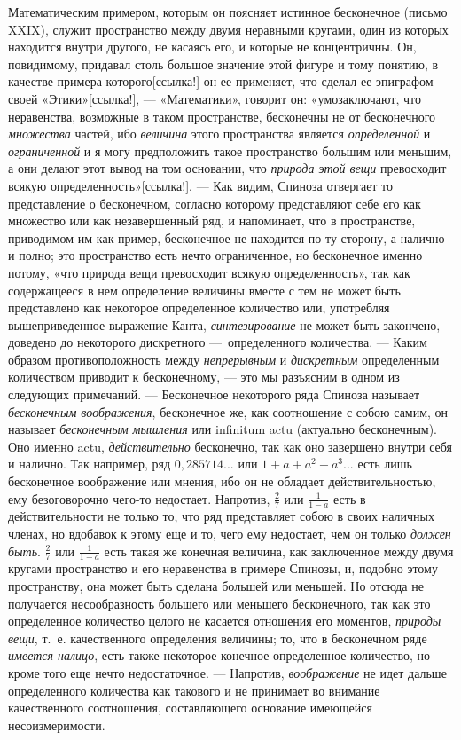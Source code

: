{Математическим примером, которым он поясняет истинное бесконечное (письмо
XXIX), служит пространство между двумя неравными кругами, один из которых
находится внутри другого, не касаясь его, и которые не концентричны. Он,
повидимому, придавал столь большое значение этой фигуре и тому понятию, в
качестве примера
которого[ссылка!] он ее применяет, что сделал ее
эпиграфом своей
«Этики»[ссылка!], — «Математики», говорит он:
«умозаключают, что неравенства, возможные в таком пространстве, бесконечны
не от бесконечного {\em множества} частей, ибо
{\em величина} этого пространства является
{\em определенной} и
{\em ограниченной} и я могу предположить такое
пространство большим или меньшим, а они делают этот вывод на том основании,
что {\em природа этой вещи} превосходит всякую
определенность»[ссылка!]. — Как видим, Спиноза
отвергает то представление о бесконечном, согласно которому представляют
себе его как множество или как незавершенный ряд, и напоминает, что в
пространстве, приводимом им как пример, бесконечное не находится по ту
сторону, а налично и полно; это пространство есть нечто ограниченное, но
бесконечное именно потому, «что природа вещи превосходит всякую
определенность», так как содержащееся в нем определение величины вместе с
тем не может быть представлено как некоторое определенное количество или,
употребляя вышеприведенное выражение Канта,
{\em синтезирование} не может быть закончено, доведено
до некоторого дискретного —~определенного количества. — Каким образом
противоположность между {\em непрерывным} и
{\em дискретным} определенным количеством приводит к
бесконечному, — это мы разъясним в одном из следующих примечаний. —
Бесконечное некоторого ряда Спиноза называет
{\em бесконечным воображения}, бесконечное же, как
соотношение с собою самим, он называет {\em бесконечным
мышления} или infinitum actu (актуально бесконечным). Оно именно actu,
{\em действительно} бесконечно, так как оно завершено
внутри себя и налично. Так например, ряд
$0,285714...$ или $1+a+a^2+a^3...$
есть лишь бесконечное воображение или мнения, ибо он не обладает
действительностью, ему безоговорочно чего-то недостает. Напротив,
$\frac 2 7$ или $\frac 1{1-a}$ есть в действительности не только то,
что ряд представляет собою в своих наличных членах, но вдобавок к этому
еще и то, чего ему недостает, чем он только {\em должен быть}.
$\frac 2 7$ или $\frac 1{1-a}$
есть такая же конечная величина, как заключенное между двумя
кругами пространство и его неравенства в примере Спинозы, и, подобно этому
пространству, она может быть сделана большей или меньшей. Но отсюда не
получается несообразность большего или меньшего бесконечного, так как это
определенное количество целого не касается отношения его моментов,
{\em природы вещи}, т.~е. качественного определения
величины; то, что в бесконечном ряде {\em имеется
налицо}, есть также некоторое конечное определенное количество, но кроме
того еще нечто недостаточное. — Напротив,
{\em воображение} не идет дальше определенного
количества как такового и не принимает во внимание качественного
соотношения, составляющего основание имеющейся несоизмеримости.

}
